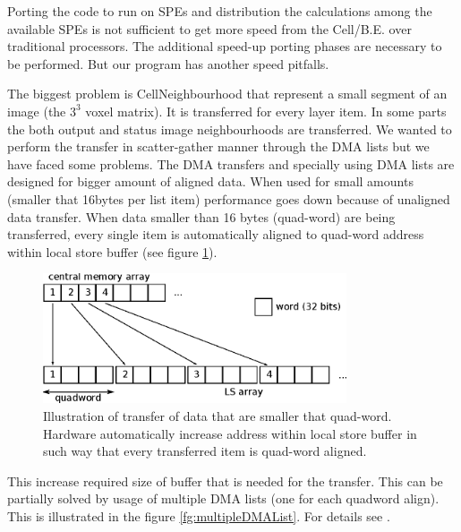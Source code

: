 \par
Porting the code to run on SPEs and distribution the calculations among the available SPEs is not sufficient to get more speed from the \mbox{Cell/B.E.} over traditional processors.
The additional speed-up porting phases are necessary to be performed.
But our program has another speed pitfalls.

\par
The biggest problem is CellNeighbourhood that represent a small segment of an image (the $3^3$ voxel matrix).
It is transferred for every layer item.
In some parts the both output and status image neighbourhoods are transferred.
We wanted to perform the transfer in scatter-gather manner through the DMA lists but we have faced some problems.
The DMA transfers and specially using DMA lists are designed for bigger amount of aligned data.
When used for small amounts (smaller that 16bytes per list item) performance goes down because of unaligned data transfer.
When data smaller than 16 bytes (quad-word) are being transferred, every single item is automatically aligned to quad-word address within local store buffer (see figure \ref{fg:automaticAlignOfSmallData}).

\begin{figure}
    \centering
    \includegraphics[width=0.8\textwidth]{data/automaticAlignOfSmallData}
    \caption[Automatic align of small data]
{
  Illustration of transfer of data that are smaller that quad-word.
  Hardware automatically increase address within local store buffer in such way that every transferred item is quad-word aligned.
}
    \label{fg:automaticAlignOfSmallData}
\end{figure}

This increase required size of buffer that is needed for the transfer.
This can be partially solved by usage of multiple DMA lists (one for each quadword align).
This is illustrated in the figure \ref{fg:multipleDMAList}.
For details see \cite{DMAListIssues}.

